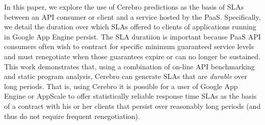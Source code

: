 In this paper, we
explore the use of Cerebro predictions as the basis of SLAs between an API
consumer or client
and a service hosted by the PaaS.  Specifically, we detail the duration
over which SLAs offered to clients of applications running in Google App
Engine persist.  The SLA duratiion is important because PaaS API consumers
often
wish to contract for specific minimum guaranteed service levels and must
renegotiate when those guarantees expire or can no longer be sustained.  
This work demonstrates that, using a combination of on-line API benchmarking
and static program analysis, Cerebro can generate SLAs that are
\textit{durable} over long periods.  That is, using Cerebro it is possible for
a user of Google App Engine or AppScale to offer statistically
reliable response time SLAs as the basis of a contract with his or her clients
that persist over reasonably long periods (and thus do not require frequent
renegotiation).


